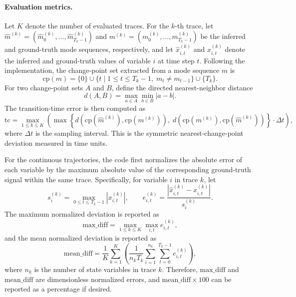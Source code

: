 \paragraph{Evaluation metrics.}
Let $K$ denote the number of evaluated traces. For the $k$-th trace, let
$\hat{m}^{(k)} = (\hat{m}^{(k)}_0,\ldots,\hat{m}^{(k)}_{T_k-1})$ and
$m^{(k)} = (m^{(k)}_0,\ldots,m^{(k)}_{T_k-1})$ be the inferred and ground-truth
mode sequences, respectively, and let $\hat{x}^{(k)}_{i,t}$ and $x^{(k)}_{i,t}$
denote the inferred and ground-truth values of variable $i$ at time step $t$.
Following the implementation, the change-point set extracted from a mode
sequence $m$ is
\[
\mathrm{cp}(m) = \{0\} \cup \{t \mid 1 \le t \le T_k - 1,\; m_t \ne m_{t-1}\}
\cup \{T_k\}.
\]
For two change-point sets $A$ and $B$, define the directed nearest-neighbor
distance
\[
d(A, B) = \max_{a \in A} \min_{b \in B} |a - b|.
\]
The transition-time error is then computed as
\[
\mathrm{tc} =
\max_{1 \le k \le K}
\left(
\max
\left\{
d(\mathrm{cp}(\hat{m}^{(k)}), \mathrm{cp}(m^{(k)})),
\; d(\mathrm{cp}(m^{(k)}), \mathrm{cp}(\hat{m}^{(k)}))
\right\}
\cdot \Delta t
\right),
\]
where $\Delta t$ is the sampling interval. This is the symmetric
nearest-change-point deviation measured in time units.

For the continuous trajectories, the code first normalizes the absolute error of
each variable by the maximum absolute value of the corresponding ground-truth
signal within the same trace. Specifically, for variable $i$ in trace $k$, let
\[
s^{(k)}_i = \max_{0 \le t \le T_k - 1} |x^{(k)}_{i,t}|,
\qquad
e^{(k)}_{i,t} = \frac{|\hat{x}^{(k)}_{i,t} - x^{(k)}_{i,t}|}{s^{(k)}_i}.
\]
The maximum normalized deviation is reported as
\[
\mathrm{max\_diff} = \max_{1 \le k \le K} \max_{i,t} e^{(k)}_{i,t},
\]
and the mean normalized deviation is reported as
\[
\mathrm{mean\_diff}
= \frac{1}{K} \sum_{k=1}^{K}
\left(
\frac{1}{n_k T_k}
\sum_{i=1}^{n_k} \sum_{t=0}^{T_k - 1} e^{(k)}_{i,t}
\right),
\]
where $n_k$ is the number of state variables in trace $k$. Therefore,
$\mathrm{max\_diff}$ and $\mathrm{mean\_diff}$ are dimensionless normalized
errors, and $\mathrm{mean\_diff} \times 100$ can be reported as a percentage if
desired.
